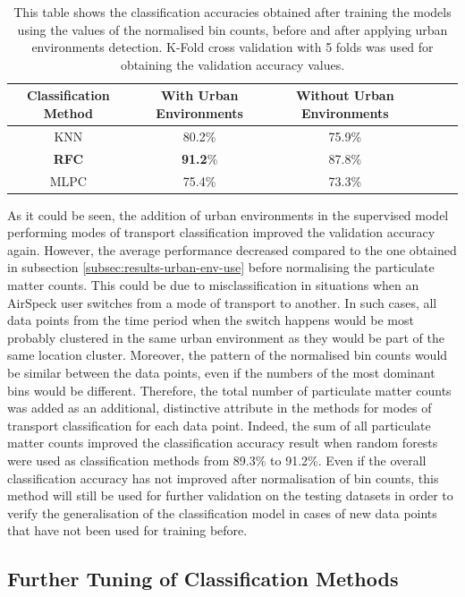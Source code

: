 \documentclass[bsc,frontabs,twoside,singlespacing, parskip,deptreport]{infthesis}     %
\begin{document}
\begin{table}[h!]
\centering
 \begin{tabular}{||c | c | c | c | c | c||} 
 \hline
 Classification Method & With Urban Environments & Without Urban Environments \\ [0.5ex] 
 \hline\hline
 KNN & 80.2\% & 75.9\% \\
 \hline
 \textbf{RFC} & \textbf{91.2}\% & 87.8\% \\ 
 \hline
  MLPC & 75.4\% & 73.3\% \\ 
 \hline
\end{tabular}
\caption{This table shows the classification accuracies obtained after training the models using the values of the normalised bin counts, before and after applying urban environments detection. K-Fold cross validation with 5 folds was used for obtaining the validation accuracy values.}
\label{table:norm-bin-counts}
\end{table}

As it could be seen, the addition of urban environments in the supervised model performing modes of transport classification improved the validation accuracy again. However, the average performance decreased compared to the one obtained  in subsection \ref{subsec:results-urban-env-use} before normalising the particulate matter counts. This could be due to misclassification in situations when an AirSpeck user switches from a mode of transport to another. In such cases, all data points from the time period when the switch happens would be most probably clustered in the same urban environment as they would be part of the same location cluster. Moreover, the pattern of the normalised bin counts would be similar between the data points, even if the numbers of the most dominant bins would be different. Therefore, the total number of particulate matter counts was added as an additional, distinctive attribute in the methods for modes of transport classification for each data point. Indeed, the sum of all particulate matter counts improved the classification accuracy result when random forests were used as classification methods from 89.3\% to 91.2\%. Even if the overall classification accuracy has not improved after normalisation of bin counts, this method will still be used for further validation on the testing datasets in order to verify the generalisation of the classification model in cases of new data points that have not been used for training before. 


\subsection{Further Tuning of Classification Methods}
\label{subsec:classifier-tweaking}
\end{document}
